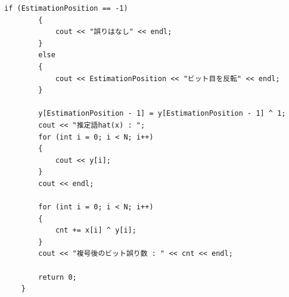 \documentclass[12pt]{jarticle}
\begin{document}
\begin{lstlisting}[style = lstcpp,caption=kadai3\_2.cpp]
        if (EstimationPosition == -1)
        {
            cout << "誤りはなし" << endl;
        }
        else
        {
            cout << EstimationPosition << "ビット目を反転" << endl;
        }
    
        y[EstimationPosition - 1] = y[EstimationPosition - 1] ^ 1;
        cout << "推定語hat(x) : ";
        for (int i = 0; i < N; i++)
        {
            cout << y[i];
        }
        cout << endl;
    
        for (int i = 0; i < N; i++)
        {
            cnt += x[i] ^ y[i];
        }
        cout << "複号後のビット誤り数 : " << cnt << endl;
    
        return 0;
    }
    
\end{lstlisting}

\end{document}
